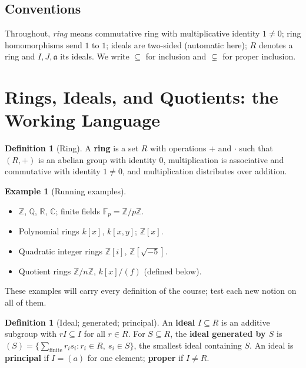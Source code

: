 \documentclass[11pt,a4paper]{article}
\theoremstyle{definition}
\newtheorem{definition}[theorem]{Definition}
\newtheorem{example}[theorem]{Example}
\newcommand{\Z}{\mathbb{Z}}
\newcommand{\Q}{\mathbb{Q}}
\newcommand{\R}{\mathbb{R}}
\newcommand{\C}{\mathbb{C}}
\newcommand{\F}{\mathbb{F}}
\newcommand{\fa}{\mathfrak{a}}
\begin{document}
	\subsection*{Conventions}
	Throughout, \emph{ring} means commutative ring with multiplicative identity $1\neq0$; ring
	homomorphisms send $1$ to $1$; ideals are two-sided (automatic here); $R$ denotes a ring and
	$I,J,\fa$ its ideals. We write $\subseteq$ for inclusion and $\subsetneq$ for proper inclusion.
	
	\tableofcontents
	\newpage
	
	\section{Rings, Ideals, and Quotients: the Working Language}
	
	\begin{definition}[Ring]
		A \textbf{ring} is a set $R$ with operations $+$ and $\cdot$ such that $(R,+)$ is an abelian
		group with identity $0$, multiplication is associative and commutative with identity $1\neq0$,
		and multiplication distributes over addition.
	\end{definition}
	
	\begin{example}[Running examples]
		\begin{itemize}
			\item $\Z$, $\Q$, $\R$, $\C$; finite fields $\F_p=\Z/p\Z$.
			\item Polynomial rings $k[x]$, $k[x,y]$; $\Z[x]$.
			\item Quadratic integer rings $\Z[i]$, $\Z[\sqrt{-5}]$.
			\item Quotient rings $\Z/n\Z$, $k[x]/(f)$ (defined below).
		\end{itemize}
		These examples will carry every definition of the course; test each new notion on all of them.
	\end{example}
	
	\begin{definition}[Ideal; generated; principal]
		An \textbf{ideal} $I\subseteq R$ is an additive subgroup with $rI\subseteq I$ for all $r\in R$.
		For $S\subseteq R$, the \textbf{ideal generated by $S$} is
		$(S)=\{\sum_{\text{finite}} r_i s_i : r_i\in R,\ s_i\in S\}$, the smallest ideal containing $S$.
		An ideal is \textbf{principal} if $I=(a)$ for one element; \textbf{proper} if $I\neq R$.
	\end{definition}
	
\end{document}

